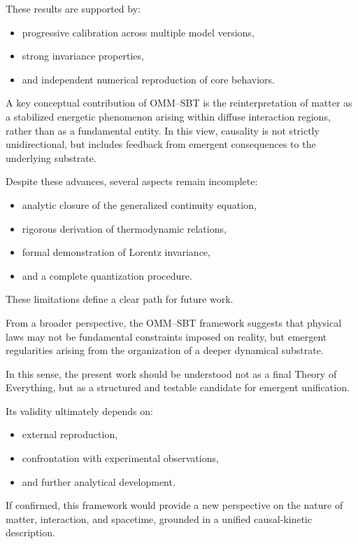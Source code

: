 \documentclass[11pt]{article}
\begin{document}
These results are supported by:

\begin{itemize}
\item progressive calibration across multiple model versions,
\item strong invariance properties,
\item and independent numerical reproduction of core behaviors.
\end{itemize}

A key conceptual contribution of OMM--SBT is the reinterpretation of matter as a stabilized energetic phenomenon arising within diffuse interaction regions, rather than as a fundamental entity. In this view, causality is not strictly unidirectional, but includes feedback from emergent consequences to the underlying substrate.

Despite these advances, several aspects remain incomplete:

\begin{itemize}
\item analytic closure of the generalized continuity equation,
\item rigorous derivation of thermodynamic relations,
\item formal demonstration of Lorentz invariance,
\item and a complete quantization procedure.
\end{itemize}

These limitations define a clear path for future work.

From a broader perspective, the OMM--SBT framework suggests that physical laws may not be fundamental constraints imposed on reality, but emergent regularities arising from the organization of a deeper dynamical substrate.

In this sense, the present work should be understood not as a final Theory of Everything, but as a structured and testable candidate for emergent unification.

Its validity ultimately depends on:

\begin{itemize}
\item external reproduction,
\item confrontation with experimental observations,
\item and further analytical development.
\end{itemize}

If confirmed, this framework would provide a new perspective on the nature of matter, interaction, and spacetime, grounded in a unified causal-kinetic description.
\end{document}
